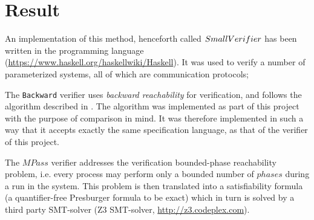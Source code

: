 \section{Result}
\label{results}
An implementation of this method, henceforth called $SmallVerifier$ has been written in the  programming language (\url{https://www.haskell.org/haskellwiki/Haskell}). It was used to verify a number of parameterized systems, all of which are communication protocols;

\vspace{10pt}
\vspace{10pt}

The \texttt{Backward} verifier uses \emph{backward reachability} for verification, and follows the algorithm described in \cite{287591}. The algorithm was implemented as part of this project with the purpose of comparison in mind. It was therefore implemented in such a way that it accepts exactly the same specification language, as that of the verifier of this project.

The $MPass$ verifier addresses the verification bounded-phase reachability problem, i.e. every process may perform only a bounded number of $phases$ during a run in the system. This problem is then translated into a satisfiability formula (a quantifier-free Presburger formula to be exact) which in turn is solved by a third party SMT-solver (Z3 SMT-solver, \url{http://z3.codeplex.com}).

